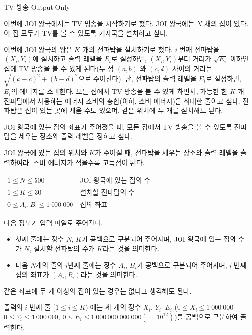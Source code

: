\begin{problem}{TV 방송}
	{}{Output Only}
	{}{}{}
	
	이번에 JOI 왕국에서는 TV 방송을 시작하기로 했다. JOI 왕국에는 $N$ 채의 집이 있다. 이 집 모두가 TV를 볼 수 있도록 기지국을 설치하고 싶다.
	
	이번에 JOI 왕국의 왕은 $K$ 개의 전파탑을 설치하기로 했다. $i$ 번째 전파탑을 $(X_i, Y_i)$에 설치하고 출력 레벨을 $E_i$로 설정하면, $(X_i, Y_i)$부터 거리가 $\sqrt{E_i}$ 이하인 집에 TV 방송을 볼 수 있게 된다(두 점 $(a, b)$ 와 $(c, d)$ 사이의 거리는 $\sqrt{(a-c)^2 + (b-d)^2}$으로 주어진다). 단, 전파탑의 출력 레벨을 $E_i$로 설정하면, $E_i$의 에너지를 소비한다. 모든 집에서 TV 방송을 볼 수 있게 하면서, 가능한 한 $K$ 개 전파탑에서 사용하는 에너지 소비의 총합(이하, 소비 에너지)을 최대한 줄이고 싶다. 전파탑은 집이 있는 곳에 세울 수도 있으며, 같은 위치에 두 개를 설치해도 된다.
	
	JOI 왕국에 있는 집의 좌표가 주어졌을 때, 모든 집에서 TV 방송을 볼 수 있도록 전파탑을 세우는 장소와 출력 레벨을 정하고 싶다.
	
	JOI 왕국에 있는 집의 위치와 $K$가 주어질 때, 전파탑을 세우는 장소와 출력 레벨을 출력하여라. 소비 에너지가 적을수록 고득점이 된다.
	
	\Constraints
	
	\begin{tabular}{ll}
		$1 \le N \le 500$ & JOI 왕국에 있는 집의 수 \\
		$1 \le K \le 30$ & 설치할 전파탑의 수 \\
		$0 \le A_i, B_i \le 1\ 000\ 000$ & 집의 좌표
	\end{tabular}
	
	\InputFile
	
	다음 정보가 입력 파일로 주어진다.
	
	\begin{itemize}
		\item 첫째 줄에는 정수 $N$, $K$가 공백으로 구분되어 주어지며, JOI 왕국에 있는 집의 수가 $N$, 설치할 전파탑의 수가 $K$라는 것을 의미한다.
		\item 다음 $N$개의 줄의 $i$번째 줄에는 정수 $A_i$, $B_i$가 공백으로 구분되어 주어지며, $i$ 번째 집의 좌표가 $(A_i, B_i)$라는 것을 의미한다.
	\end{itemize}

	같은 좌표에 두 개 이상의 집이 있는 경우는 없다고 생각해도 된다.
	
	\OutputFile
	
	출력의 $i$ 번째 줄 ($1 \le i \le K$) 에는 세 개의 정수 $X_i$, $Y_i$, $E_i$ ($0 \le X_i \le 1\ 000\ 000$, $0 \le Y_i \le 1\ 000\ 000$, $0 \le E_i \le 1\ 000\ 000\ 000\ 000 (=10^{12})$)를 공백으로 구분하여 출력한다.


\end{problem}
